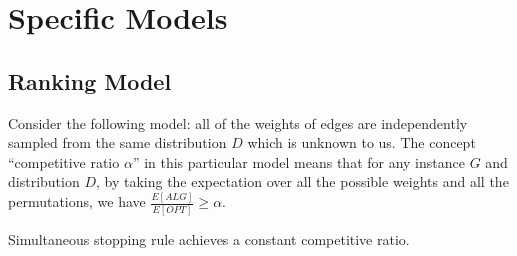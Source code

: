 \chapter{Specific Models}

\section{Ranking Model}

Consider the following model:
all of the weights of edges are independently sampled from the same distribution $D$ which is unknown to us.
The concept ``competitive ratio $\alpha$'' in this particular model means that for any instance $G$ and distribution $D$, by taking the expectation over all the possible weights and all the permutations, we have $\frac{E[ALG]}{E[OPT]} \ge \alpha$.

\begin{theorem}\label{rothm}
    Simultaneous stopping rule achieves a constant competitive ratio.
\end{theorem}

